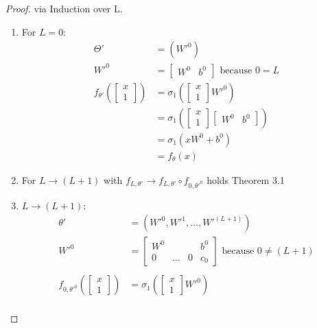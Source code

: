 \documentclass[a4paper]{article}
\theoremstyle{definition}
\begin{document}
\begin{proof}
    via Induction over L.\\
    \begin{enumerate}
        \item For $L=0$:\\
        \begin{align}
            \Theta'&=(W'^0) \\
            W'^0 &= \begin{bmatrix}
                W^0 & b^0
            \end{bmatrix} \text{ because } 0=L \\
            f_{\theta'}(\begin{bmatrix}x\\1\end{bmatrix}) &= \sigma_1(\begin{bmatrix}x\\1\end{bmatrix}W'^0) \\
            &= \sigma_1(\begin{bmatrix}x\\1\end{bmatrix}\begin{bmatrix}
                W^0 & b^0
            \end{bmatrix})\\
            &= \sigma_1(xW^0 + b^0)\\
            &= f_{\theta}(x)
        \end{align}
        \item For $L \rightarrow (L+1)$ with $f_{L,\theta'} \rightarrow f_{L,\theta'} \circ f_{0,\theta'^0}$ holds Theorem 3.1
        \item $L \rightarrow (L+1)$:\\
        \begin{align}
            \theta' &= (W'^0, W'^1,\dots, W'^{(L+1)}) \\
            W'^{0} &= \begin{bmatrix}
                W^0 & & & b^0\\
                0 & \dots & 0 & c_0
            \end{bmatrix} \text{ because } 0\neq(L+1)\\
            \\
            f_{0,\theta'^0}(\begin{bmatrix}x\\1\end{bmatrix}) &= \sigma_1(\begin{bmatrix}x\\1\end{bmatrix}W'^0)\\

\end{align}
\end{enumerate}
\end{proof}
\end{document}
